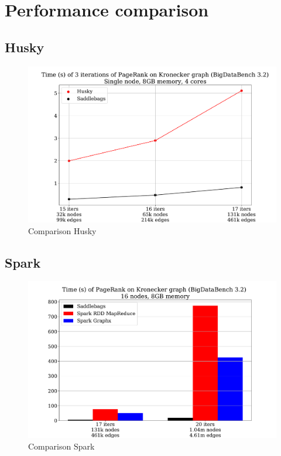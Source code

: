 \documentclass{uit-report}
\begin{document}
\section{Performance comparison} \label{section:performance}
\subsection{Husky}

\begin{figure}[H]
	\centering
	\includegraphics[width=15cm]{illustrations/huskypagerank.pdf}
	\caption{Comparison Husky}
	\label{fig:huskypagerank}
\end{figure}

\subsection{Spark}

\begin{figure}[H]
	\centering
	\includegraphics[width=15cm]{illustrations/sparkpagerank.pdf}
	\caption{Comparison Spark}
	\label{fig:sparkpagerank}
\end{figure}
\end{document}
